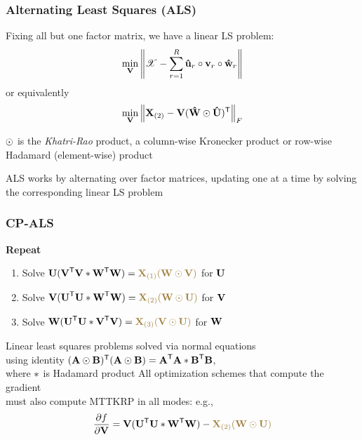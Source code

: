 \documentclass[xcolor=dvipsnames]{beamer}
\begin{document}
\begin{frame}
\frametitle{Alternating Least Squares (ALS)}

Fixing all but one factor matrix, we have a linear LS problem:
$$\min_{\M{V}} \left\|\T{X}-\sum_{r=1}^R \MC[\hat]{U}{r}\circ\MC{V}{r}\circ\MC[\hat]{W}{r}\right\| $$
or equivalently
$$\min_{\M{V}} \left\|\Mz{X}{2}-\M{V}(\M[\hat]{W} \Khat \M[\hat]{U})^\Tra\right\|_F $$

\begin{center}

\vfill

$\odot$ is the \emph{Khatri-Rao} product, a column-wise Kronecker product or row-wise Hadamard (element-wise) product

\vfill

ALS works by alternating over factor matrices, updating one at a time by solving the corresponding linear LS problem

\end{center}

\end{frame}

\begin{frame}
\frametitle{CP-ALS}

\textbf{Repeat}
\begin{enumerate}
	\item Solve $\M{U}(\M{V}^\Tra\M{V} \Hada \M{W}^\Tra\M{W}) = \textcolor{wfugold}{\Mz{X}{1}(\M{W} \Khat \M{V})}$ for $\M{U}$ 
	\item Solve $\M{V}(\M{U}^\Tra\M{U} \Hada \M{W}^\Tra\M{W}) = \textcolor{wfugold}{\Mz{X}{2}(\M{W} \Khat \M{U})}$ for $\M{V}$ 
	\item Solve $\M{W}(\M{U}^\Tra\M{U} \Hada \M{V}^\Tra\M{V}) = \textcolor{wfugold}{\Mz{X}{3}(\M{V} \Khat \M{U})}$ for $\M{W}$ 
\end{enumerate}

\vfill

\begin{center}
{\small
Linear least squares problems solved via normal equations \\ using identity $(\M{A}\Khat\M{B})^\Tra(\M{A}\Khat\M{B}) = \M{A}^\Tra\M{A} \Hada \M{B}^\Tra\M{B}$, \\ where $\ast$ is Hadamard product
\vfill
All optimization schemes that compute the gradient \\ must also compute \textcolor{wfugold}{MTTKRP} in all modes: e.g.,
$$\frac{\partial f}{\partial \M{V}} = \M{V}(\M{U}^\Tra\M{U} \Hada \M{W}^\Tra\M{W}) - \textcolor{wfugold}{\Mz{X}{2}(\M{W} \Khat \M{U})}$$
}
\end{center}

\end{frame}
\end{document}
